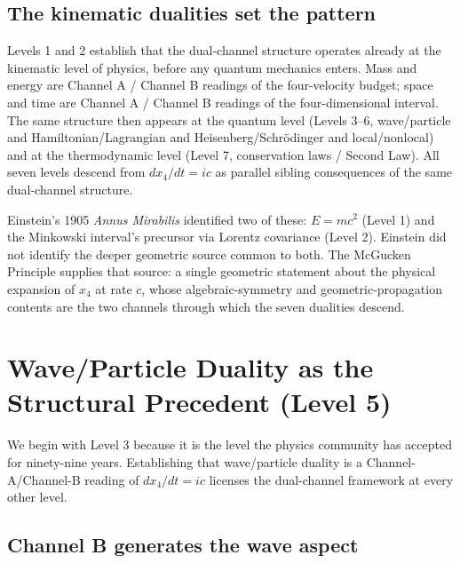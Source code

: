 \documentclass[11pt,a4paper]{article}
\begin{document}
\subsection{The kinematic dualities set the pattern}

Levels 1 and 2 establish that the dual-channel structure operates already at the kinematic level of physics, before any quantum mechanics enters. Mass and energy are Channel A / Channel B readings of the four-velocity budget; space and time are Channel A / Channel B readings of the four-dimensional interval. The same structure then appears at the quantum level (Levels 3--6, wave/particle and Hamiltonian/Lagrangian and Heisenberg/Schr\"odinger and local/nonlocal) and at the thermodynamic level (Level 7, conservation laws / Second Law). All seven levels descend from $dx_4/dt = ic$ as parallel sibling consequences of the same dual-channel structure.

Einstein's 1905 \emph{Annus Mirabilis} identified two of these: $E = mc^2$ (Level 1) and the Minkowski interval's precursor via Lorentz covariance (Level 2). Einstein did not identify the deeper geometric source common to both. The McGucken Principle supplies that source: a single geometric statement about the physical expansion of $x_4$ at rate $c$, whose algebraic-symmetry and geometric-propagation contents are the two channels through which the seven dualities descend.

\section{Wave/Particle Duality as the Structural Precedent (Level 5)}
\label{sec:wpd}

We begin with Level 3 because it is the level the physics community has accepted for ninety-nine years. Establishing that wave/particle duality is a Channel-A/Channel-B reading of $dx_4/dt = ic$ licenses the dual-channel framework at every other level.

\subsection{Channel B generates the wave aspect}
\end{document}
